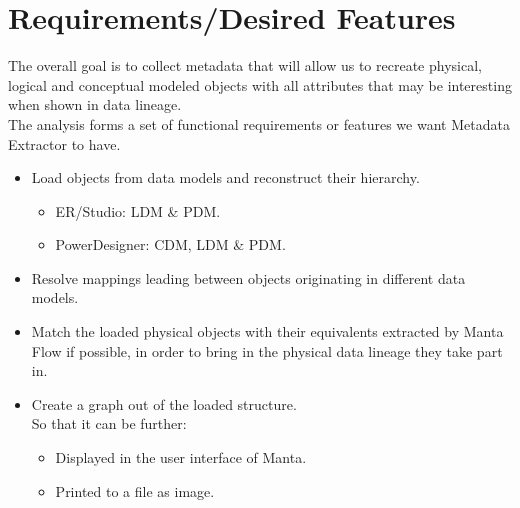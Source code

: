 \section{Requirements/Desired Features}

The overall goal is to collect metadata that will allow us to recreate physical, logical and conceptual modeled objects with all attributes that may be interesting when shown in data lineage. \\ 

The analysis forms a set of functional requirements or features we want Metadata Extractor to have.

\begin{itemize}
	\item Load objects from data models and reconstruct their hierarchy.
	\begin{itemize}
		\item ER/Studio: LDM \& PDM.
		\item PowerDesigner:  CDM, LDM \& PDM.
	\end{itemize}
	\item Resolve mappings leading between objects originating in different data models.
	\item Match the loaded physical objects with their equivalents extracted by Manta Flow if possible, in order to bring in the physical data lineage they take part in.
	\item Create a graph out of the loaded structure. \\
	So that it can be further:
	\begin{itemize}
		\item Displayed in the user interface of Manta.
		\item Printed to a file as image.
	\end{itemize}
\end{itemize}

\\

